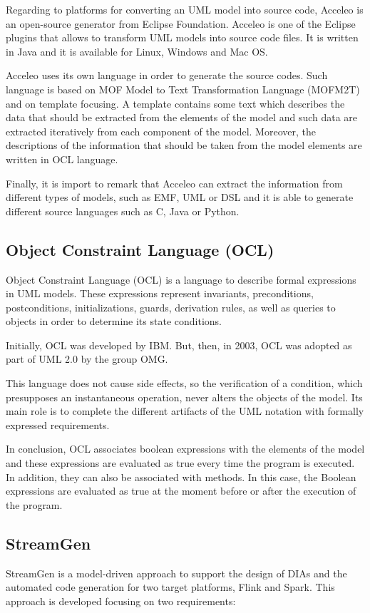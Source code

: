 Regarding to platforms for converting an UML model into source code, Acceleo is an open-source generator from Eclipse Foundation. Acceleo is
one of the Eclipse plugins that allows to transform UML models into source code files. It is written in Java and it is available for Linux, Windows and Mac OS.

Acceleo uses its own language in order to generate the source codes. Such language is based on MOF Model to Text Transformation Language (MOFM2T) and on template focusing. A template contains some text which describes the data that should be extracted from the elements of the model and such data are extracted iteratively from each component of the model. Moreover, the descriptions of the information that should be taken from the model elements are written in OCL language.

Finally, it is import to remark that Acceleo can extract the information from different types of models, such as EMF, UML or DSL and it is able to generate different source languages such as C, Java or Python.

\subsection{Object Constraint Language (OCL)}

Object Constraint Language (OCL) is a language to describe formal expressions in UML models. These expressions represent invariants, preconditions, postconditions, initializations, guards, derivation rules, as well as queries to objects in order to determine its state conditions. 

Initially, OCL was developed by IBM. But, then, in 2003, OCL was adopted as part of UML 2.0 by the group OMG.

This language does not cause side effects, so the verification of a condition, which presupposes an instantaneous operation, never alters the objects of the model. Its main role is to complete the different artifacts of the UML notation with formally expressed requirements.

In conclusion, OCL associates boolean expressions with the elements of the model and these expressions are evaluated as true every time the program is executed. In addition, they can also be associated with methods. In this case, the Boolean expressions are evaluated as true at the moment before or after the execution of the program.

\subsection{StreamGen}
StreamGen is a model-driven approach to support the design of DIAs and the automated code generation for two target platforms, Flink and Spark. This approach is developed focusing on two requirements:

